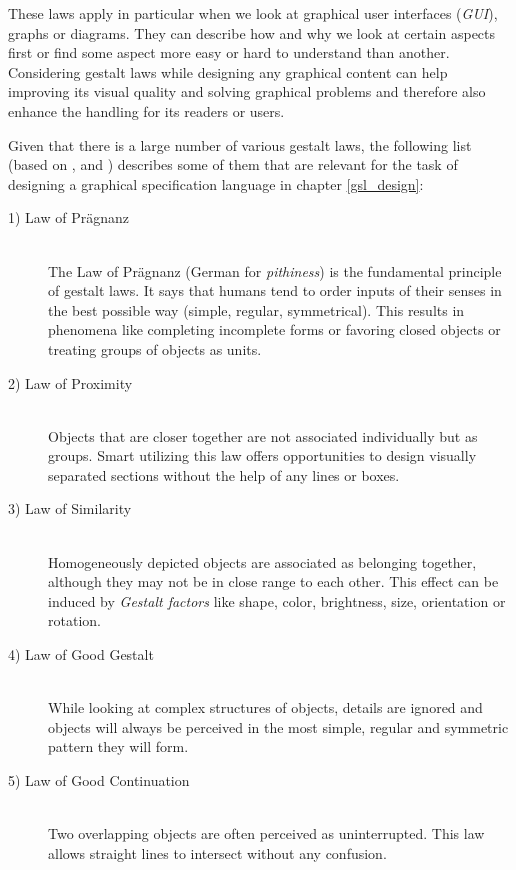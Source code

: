 \documentclass[twoside, openright, 12pt]{book}
\begin{document}
These laws apply in particular when we look at graphical user interfaces (\textit{GUI}), graphs or diagrams.
They can describe how and why we look at certain aspects first or find some aspect more easy or hard to understand than another.
Considering gestalt laws while designing any graphical content can help improving its visual quality and solving graphical problems and therefore also enhance the handling for its readers or users.

Given that there is a large number of various gestalt laws, the following list (based on \citep{Goeckel01a}, \citep{Heinecke04a} and \citep{Sternberg}) describes some of them that are relevant for the task of designing a graphical specification language in chapter \ref{gsl_design}:

\begin{description}
\item[1) Law of Prägnanz]\hfill \\
The Law of Prägnanz (German for \textit{pithiness}) is the fundamental principle of gestalt laws.
It says that humans tend to order inputs of their senses in the best possible way (simple, regular, symmetrical).
This results in phenomena like completing incomplete forms or favoring closed objects or treating groups of objects as units.

\item[2) Law of Proximity]\hfill \\
Objects that are closer together are not associated individually but as groups.
Smart utilizing this law offers opportunities to design visually separated sections without the help of any lines or boxes.

\item[3) Law of Similarity]\hfill \\
Homogeneously depicted objects are associated as belonging together, although they may not be in close range to each other.
This effect can be induced by \textit{Gestalt factors} like shape, color, brightness, size, orientation or rotation.

\item[4) Law of Good Gestalt]\hfill \\
While looking at complex structures of objects, details are ignored and objects will always be perceived in the most simple, regular and symmetric pattern they will form.

\item[5) Law of Good Continuation]\hfill \\
Two overlapping objects are often perceived as uninterrupted.
This law allows straight lines to intersect without any confusion.
\end{description}
\end{document}
